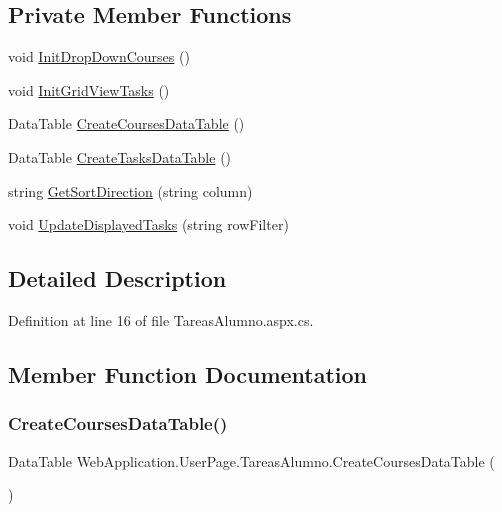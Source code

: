 \subsection*{Private Member Functions}
\begin{DoxyCompactItemize}
\item 
void \mbox{\hyperlink{classWebApplication_1_1UserPage_1_1TareasAlumno_ab0cfef17218faaef8b7a36d84b04ab7f}{Init\+Drop\+Down\+Courses}} ()
\item 
void \mbox{\hyperlink{classWebApplication_1_1UserPage_1_1TareasAlumno_a6b78d89c9fb546945e4ecd7558ae1978}{Init\+Grid\+View\+Tasks}} ()
\item 
Data\+Table \mbox{\hyperlink{classWebApplication_1_1UserPage_1_1TareasAlumno_aa74dc79d1151789f04e301c0647e0ce3}{Create\+Courses\+Data\+Table}} ()
\item 
Data\+Table \mbox{\hyperlink{classWebApplication_1_1UserPage_1_1TareasAlumno_a96f3e4eb196b0f51b3c1f44999ebc3f0}{Create\+Tasks\+Data\+Table}} ()
\item 
string \mbox{\hyperlink{classWebApplication_1_1UserPage_1_1TareasAlumno_a7907c4d40a61f3a8c7390f7e1ad27219}{Get\+Sort\+Direction}} (string column)
\item 
void \mbox{\hyperlink{classWebApplication_1_1UserPage_1_1TareasAlumno_ad2e2604904288558892729f8b67954b3}{Update\+Displayed\+Tasks}} (string row\+Filter)
\end{DoxyCompactItemize}


\subsection{Detailed Description}


Definition at line 16 of file Tareas\+Alumno.\+aspx.\+cs.



\subsection{Member Function Documentation}
\mbox{\label{classWebApplication_1_1UserPage_1_1TareasAlumno_aa74dc79d1151789f04e301c0647e0ce3}} 
\subsubsection{\texorpdfstring{CreateCoursesDataTable()}{CreateCoursesDataTable()}}
{\footnotesize\ttfamily Data\+Table Web\+Application.\+User\+Page.\+Tareas\+Alumno.\+Create\+Courses\+Data\+Table (\begin{DoxyParamCaption}{ }\end{DoxyParamCaption})\hspace{0.3cm}{\ttfamily [private]}}



